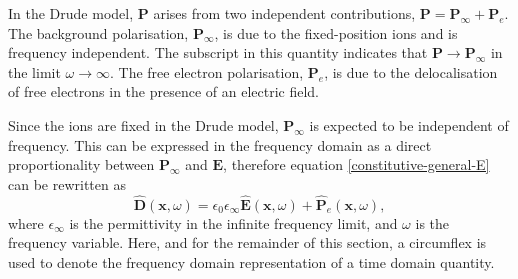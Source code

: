 In the Drude model, $\mathbf{P}$ arises from two independent contributions, $\mathbf{P} = \mathbf{P}_{\infty} + \mathbf{P}_e$. The background polarisation, $\mathbf{P}_{\infty}$, is due to the fixed-position ions and is frequency independent. The subscript in this quantity indicates that $\mathbf{P} \to \mathbf{P}_{\infty}$ in the limit $\omega \to \infty$. The free electron polarisation, $\mathbf{P}_e$, is due to the delocalisation of free electrons in the presence of an electric field.

Since the ions are fixed in the Drude model, $\mathbf{P}_{\infty}$ is expected to be independent of frequency. This can be expressed in the frequency domain as a direct proportionality between $\mathbf{P}_{\infty}$ and $\mathbf{E}$, therefore equation \ref{constitutive-general-E} can be rewritten as
%
\begin{equation}
\label{eq:constitutive_equations_drude_model}
\hat{\mathbf{D}}(\mathbf{x},\omega) = \epsilon_0 \epsilon_{\infty}  \hat{\mathbf{E}}(\mathbf{x}, \omega) + \hat{\mathbf{P}}_e(\mathbf{x},\omega) ,
\end{equation}
%
where $\epsilon_{\infty}$ is the permittivity in the infinite frequency limit, and $\omega$ is the frequency variable. Here, and for the remainder of this section, a circumflex is used to denote the frequency domain representation of a time domain quantity.

